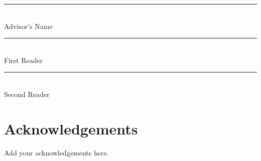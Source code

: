 \documentclass[12pt, oneside]{book}
\begin{document}
\begin{titlepage}
\begin{center}
\vspace{1.5cm}

\rule[-0.1cm]{8cm}{0.01cm} \\
Advisor's Name \\
\vspace{1.0cm}
\rule[-0.1cm]{8cm}{0.01cm} \\
First Reader \\
\vspace{1.0cm}
\rule[-0.1cm]{8cm}{0.01cm} \\
Second Reader \\
\end{center}
\thispagestyle{empty}
\end{titlepage}

\singlespacing
\setcounter{page}{3}
\tableofcontents
\setcounter{tocdepth}{2}
\cleardoublepage
{}
\listoftables
\cleardoublepage
{}
\listoffigures


\newpage

\chapter{Acknowledgements}

\noindent Add your acknowledgements here.

\mainmatter






%

%
\


\appendix



\printglossaries

\backmatter



\end{document}
